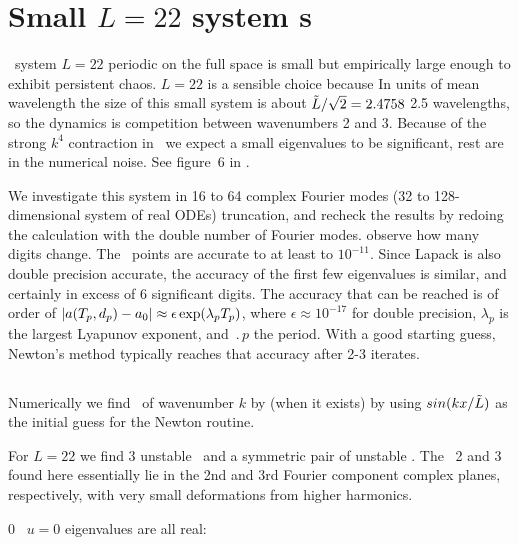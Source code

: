 %


\section{Small $L=22$ system {\rpo s}}
\label{s:L22}


\KS\ system $L = 22$ periodic on the full space is small but empirically 
large enough to exhibit persistent chaos.  $L=22$ is a sensible choice 
because In units of mean wavelength the size of this small system is about 
$ \tilde{L}/\sqrt{2}= 2.4758$ 2.5 wavelengths, so the dynamics is 
competition between wavenumbers 2 and 3. Because of the strong $k^4$ 
contraction in \KS\ we expect a small eigenvalues to be significant, rest 
are in the numerical noise. See figure~6 in .

 We investigate this system in 16 to 64 complex Fourier modes (32 to 
128-dimensional system of real ODEs) truncation, and recheck the results 
by redoing the calculation with the double number of Fourier modes. %
observe how many digits change. The \eqv\ points are accurate to at least 
to $10^{-11}$. Since Lapack is also double precision accurate, the 
accuracy of the first few eigenvalues is similar, and certainly in excess 
of 6 significant digits. %
The accuracy that can be reached is of order of 
$|a({T_{p}},d_p) - a_0| 
 \approx \epsilon \exp(\lambda_p {T_{p}})$, 
 where $\epsilon \approx 10^{-17}$ for double precision, $\lambda_p$ is 
the largest Lyapunov exponent, and $\period{p}$ the period.  With a good 
starting guess, Newton's method typically reaches that accuracy after 2-3 
iterates.

\subsection{\Eqva}

Numerically we find \eqv\ of wavenumber $k$ by (when it exists)
by using $sin( k x /\tilde{L})$ as the initial guess for the Newton routine.

For $L = 22$ we find
3 unstable \eqva\ and a symmetric pair of unstable \reqva.
The \eqva\ {\nameit}2 and {\nameit}3 found here
essentially lie in the 2nd and 3rd Fourier component complex planes,
respectively, with very
small deformations from higher harmonics.

{\nameit}0 \eqv\  $u=0$ eigenvalues are all real:


